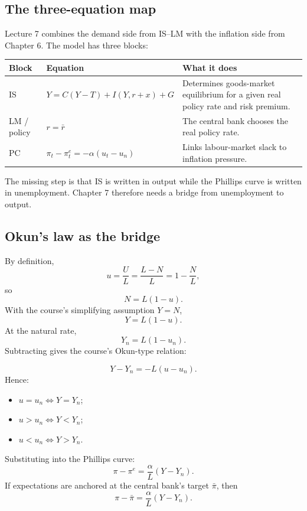 \documentclass[12pt]{article}
\begin{document}
\subsection{The three-equation map}

Lecture 7 combines the demand side from IS--LM with the inflation side from Chapter 6. The model has three blocks:

\begin{center}
\renewcommand{\arraystretch}{1.2}
\begin{tabularx}{\textwidth}{|p{1.8cm}|p{4.7cm}|X|}
\hline
\textbf{Block} & \textbf{Equation} & \textbf{What it does} \\
\hline
IS & \(Y=C(Y-T)+I(Y,r+x)+G\) & Determines goods-market equilibrium for a given real policy rate and risk premium. \\
\hline
LM / policy & \(r=\bar r\) & The central bank chooses the real policy rate. \\
\hline
PC & \(\pi_t-\pi_t^e=-\alpha(u_t-u_n)\) & Links labour-market slack to inflation pressure. \\
\hline
\end{tabularx}
\end{center}

The missing step is that IS is written in output while the Phillips curve is written in unemployment. Chapter 7 therefore needs a bridge from unemployment to output.

\subsection{Okun's law as the bridge}

By definition,
\[
u=\frac{U}{L}=\frac{L-N}{L}=1-\frac{N}{L},
\]
so
\[
N=L(1-u).
\]
With the course's simplifying assumption $Y=N$,
\[
Y=L(1-u).
\]
At the natural rate,
\[
Y_n=L(1-u_n).
\]
Subtracting gives the course's Okun-type relation:

\begin{keyformula}[title={Key Formula: Output gap and unemployment gap}]
\[
Y-Y_n=-L(u-u_n).
\]
Hence:
\begin{itemize}[leftmargin=1.5em]
\item \(u=u_n \iff Y=Y_n\);
\item \(u>u_n \iff Y<Y_n\);
\item \(u<u_n \iff Y>Y_n\).
\end{itemize}
\end{keyformula}

Substituting into the Phillips curve:
\[
\pi-\pi^e=\frac{\alpha}{L}(Y-Y_n).
\]
If expectations are anchored at the central bank's target $\bar{\pi}$, then
\[
\pi-\bar{\pi}=\frac{\alpha}{L}(Y-Y_n).
\]
\end{document}
